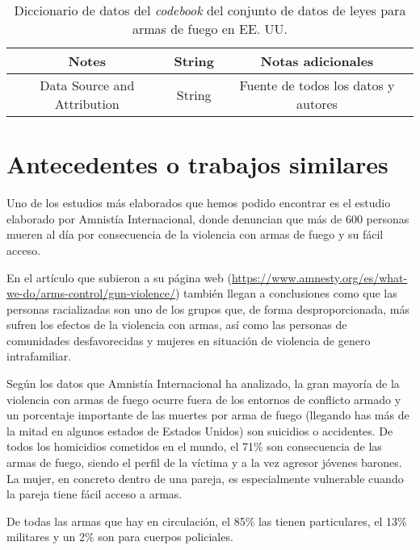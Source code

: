 \documentclass[11pt,a4paper]{article}
\begin{document}
\begin{table}[H]
\begin{tabular}{|c|c|c|}
Notes                             & String                & Notas adicionales                                                                                                                                              \\ \hline
Data Source and Attribution       & String                & Fuente de todos los datos y autores                                                                                                                            \\ \hline
\end{tabular}
    \caption{Diccionario de datos del \textit{codebook} del conjunto de datos de leyes para armas de fuego en EE. UU.}
    \label{tab:dict_datos_leyes_cb}
\end{table}

\section{Antecedentes o trabajos similares}

Uno de los estudios más elaborados que hemos podido encontrar es el estudio elaborado por Amnistía Internacional, donde denuncian que más de 600 personas mueren al día por consecuencia de la violencia con armas de fuego y su fácil acceso. 

En el artículo que subieron a su página web (\url{https://www.amnesty.org/es/what-we-do/arms-control/gun-violence/}) también llegan a conclusiones como que las personas racializadas son uno de los grupos que, de forma desproporcionada, más sufren los efectos de la violencia con armas, así como las personas de comunidades desfavorecidas y mujeres en situación de violencia de genero intrafamiliar. 

Según los datos que Amnistía Internacional ha analizado, la gran mayoría de la violencia con armas de fuego ocurre fuera de los entornos de conflicto armado y un porcentaje importante de las muertes por arma de fuego (llegando has más de la mitad en algunos estados de Estados Unidos) son suicidios o accidentes. De todos los homicidios cometidos en el mundo, el 71\% son consecuencia de las armas de fuego, siendo el perfil de la víctima y a la vez agresor jóvenes barones. La mujer, en concreto dentro de una pareja, es especialmente vulnerable cuando la pareja tiene fácil acceso a armas. 

De todas las armas que hay en circulación, el 85\% las tienen particulares, el 13\% militares y un 2\% son para cuerpos policiales. 
\end{document}
